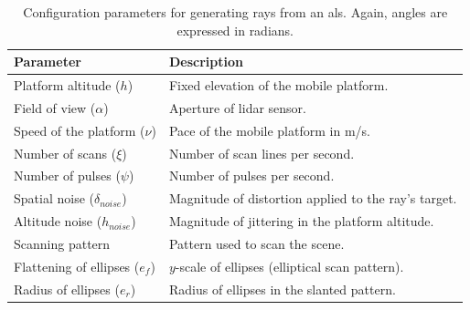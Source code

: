 \renewcommand{\arraystretch}{1.2}
\begin{table}
    \sffamily\small
    \caption{Configuration parameters for generating rays from an \acrshort{als}. Again, angles are expressed in radians.}
    \label{table:als_parameters}
    \centering
    \begin{tabular}{ll}
    \toprule
    \textbf{Parameter} & \textbf{Description} \\
    \midrule
    Platform altitude ($h$) & Fixed elevation of the mobile platform.\\
    Field of view ($\alpha$) & Aperture of \acrshort{lidar} sensor. \\
    Speed of the platform ($\nu$) & Pace of the mobile platform in \si{\meter/\second}. \\
    Number of scans ($\xi$) & Number of scan lines per second. \\
    Number of pulses ($\psi$) & Number of pulses per second. \\
    Spatial noise ($\delta_{\textit{noise}}$) & Magnitude of distortion applied to the ray's target.\\
    Altitude noise ($h_{\textit{noise}}$) & Magnitude of jittering in the platform altitude.\\
    Scanning pattern & Pattern used to scan the scene. \\
    Flattening of ellipses ($e_{f}$) & $y$-scale of ellipses (elliptical scan pattern). 
    \\
    Radius of ellipses ($e_{r}$) & Radius of ellipses in the slanted pattern.\\
    \bottomrule
    \end{tabular}
\end{table}
\renewcommand{\arraystretch}{1}

